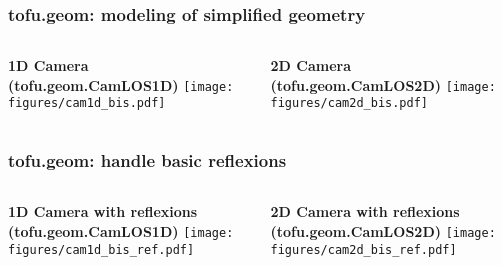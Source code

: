 \documentclass[10pt]{beamer}
\begin{document}
\begin{frame}
\frametitle{tofu.geom: modeling of simplified geometry}
\begin{columns}
		\begin{column}{0.5\textwidth}
		\begin{center}
		\textbf{1D Camera\\(tofu.geom.CamLOS1D)}
		\texttt{[image: figures/cam1d\_bis.pdf]}
	\end{center}
		\end{column}
		\pause
		\begin{column}{0.5\textwidth}
		\begin{center}
		\textbf{2D Camera\\(tofu.geom.CamLOS2D)}
		\texttt{[image: figures/cam2d\_bis.pdf]}
	\end{center}
		\end{column}
	\end{columns}
\end{frame}

\begin{frame}
\frametitle{tofu.geom: handle basic reflexions}
\begin{columns}
		\begin{column}{0.5\textwidth}
		\begin{center}
		\textbf{1D Camera with reflexions\\(tofu.geom.CamLOS1D)}
		\texttt{[image: figures/cam1d\_bis\_ref.pdf]}
	\end{center}
		\end{column}
		\begin{column}{0.5\textwidth}
		\begin{center}
		\textbf{2D Camera with reflexions\\(tofu.geom.CamLOS2D)}
		\texttt{[image: figures/cam2d\_bis\_ref.pdf]}
	\end{center}
		\end{column}
	\end{columns}
\end{frame}
\end{document}

